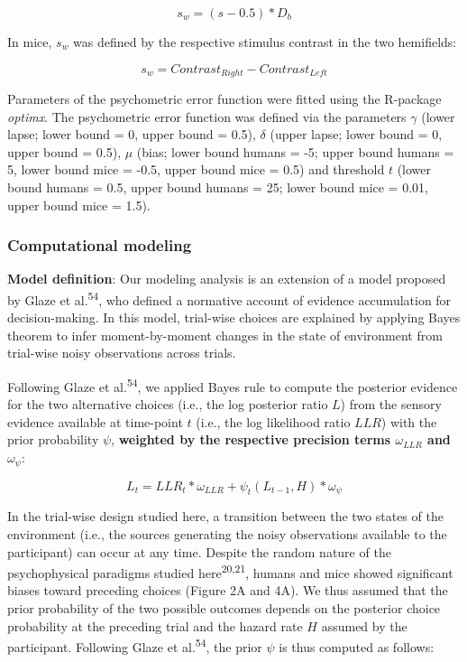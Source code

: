 \documentclass[
]{article}
\begin{document}
\begin{equation}
s_w = (s - 0.5) * D_b
\end{equation}

In mice, \(s_w\) was defined by the respective stimulus contrast in the
two hemifields:

\begin{equation}
s_w = Contrast_{Right} - Contrast_{Left}
\end{equation}

Parameters of the psychometric error function were fitted using the
R-package \emph{optimx}. The psychometric error function was defined via
the parameters \(\gamma\) (lower lapse; lower bound = 0, upper bound =
0.5), \(\delta\) (upper lapse; lower bound = 0, upper bound = 0.5),
\(\mu\) (bias; lower bound humans = -5; upper bound humans = 5, lower
bound mice = -0.5, upper bound mice = 0.5) and threshold \(t\) (lower
bound humans = 0.5, upper bound humans = 25; lower bound mice = 0.01,
upper bound mice = 1.5).

\hypertarget{computational-modeling}{%
\subsubsection{Computational modeling}\label{computational-modeling}}

\textbf{Model definition}: Our modeling analysis is an extension of a
model proposed by Glaze et al.\textsuperscript{54}, who defined a
normative account of evidence accumulation for decision-making. In this
model, trial-wise choices are explained by applying Bayes theorem to
infer moment-by-moment changes in the state of environment from
trial-wise noisy observations across trials.

Following Glaze et al.\textsuperscript{54}, we applied Bayes rule to
compute the posterior evidence for the two alternative choices (i.e.,
the log posterior ratio \(L\)) from the sensory evidence available at
time-point \(t\) (i.e., the log likelihood ratio \(LLR\)) with the prior
probability \(\psi\), \textbf{weighted by the respective precision terms
\(\omega_{LLR}\) and \(\omega_{\psi}\)}:

\begin{equation}
L_t = LLR_t * \omega_{LLR} + \psi_t(L_{t-1}, H) * \omega_{\psi}
\end{equation}

In the trial-wise design studied here, a transition between the two
states of the environment (i.e., the sources generating the noisy
observations available to the participant) can occur at any time.
Despite the random nature of the psychophysical paradigms studied
here\textsuperscript{20,21}, humans and mice showed significant biases
toward preceding choices (Figure 2A and 4A). We thus assumed that the
prior probability of the two possible outcomes depends on the posterior
choice probability at the preceding trial and the hazard rate \(H\)
assumed by the participant. Following Glaze et al.\textsuperscript{54},
the prior \(\psi\) is thus computed as follows:
\end{document}
